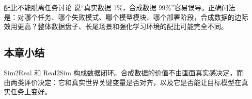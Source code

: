 \begin{warningbox}{配比不能脱离任务讨论}
说“真实数据 1\%，合成数据 99\%”容易误导。正确问法是：对哪个任务、哪个失败模式、哪个模型模块、哪个部署阶段，合成数据的边际效用更高？整体数据盘子、长尾场景和强化学习环境的配比可能完全不同。
\end{warningbox}

\subsection{本章小结}

Sim2Real 和 Real2Sim 构成数据闭环。合成数据的价值不由画面真实感决定，而由两类评价决定：它和真实世界关键变量是否对齐，以及它是否能让目标模型在真实任务上变好。

